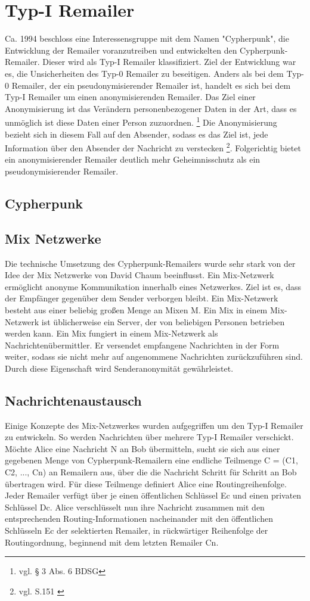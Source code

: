 \chapter{Typ-I Remailer}
Ca. 1994 beschloss eine Interessensgruppe mit dem Namen "Cypherpunk", die Entwicklung der Remailer voranzutreiben und entwickelten den Cypherpunk-Remailer. Dieser wird als Typ-I Remailer klassifiziert. Ziel der Entwicklung war es, die Unsicherheiten des Typ-0 Remailer zu beseitigen. 
Anders als bei dem Typ-0 Remailer, der ein pseudonymisierender Remailer ist, handelt es sich bei dem Typ-I Remailer um einen anonymisierenden Remailer. Das Ziel einer Anonymisierung ist das Verändern personenbezogener Daten in der Art, dass es unmöglich ist diese Daten einer Person zuzuordnen. \footnote {vgl. § 3 Abs. 6 BDSG}
Die Anonymisierung bezieht sich in diesem Fall auf den Absender, sodass es das Ziel ist, jede Information über den Absender der Nachricht zu verstecken \footnote{vgl. S.151 \cite{horster2013datenschutz}}. Folgerichtig bietet ein anonymisierender Remailer deutlich mehr Geheimnisschutz als ein pseudonymisierender Remailer. 


\section{Cypherpunk}

\section{Mix Netzwerke}
Die technische Umsetzung des Cypherpunk-Remailers wurde sehr stark von der Idee der Mix Netzwerke von David Chaum beeinflusst. Ein Mix-Netzwerk ermöglicht anonyme Kommunikation innerhalb eines Netzwerkes. Ziel ist es, dass der Empfänger gegenüber dem Sender verborgen bleibt.
Ein Mix-Netzwerk besteht aus einer beliebig großen Menge an Mixen M. Ein Mix in einem Mix-Netzwerk ist üblicherweise ein Server, der von beliebigen Personen betrieben werden kann. Ein Mix fungiert in einem Mix-Netzwerk als Nachrichtenübermittler. Er versendet empfangene Nachrichten in der Form weiter, sodass sie nicht mehr auf angenommene Nachrichten zurückzuführen sind. Durch diese Eigenschaft wird Senderanonymität gewährleistet.

\section{Nachrichtenaustausch}
Einige Konzepte des Mix-Netzwerkes wurden aufgegriffen um den Typ-I Remailer zu entwickeln. So werden Nachrichten über mehrere Typ-I Remailer verschickt. Möchte Alice eine Nachricht N an Bob übermitteln, sucht sie sich aus einer gegebenen Menge von Cypherpunk-Remailern eine endliche Teilmenge C = (C1, C2, ..., Cn) an Remailern aus, über die die Nachricht Schritt für Schritt an Bob übertragen wird. Für diese Teilmenge definiert Alice eine Routingreihenfolge. Jeder Remailer verfügt über je einen öffentlichen Schlüssel Ec und einen privaten Schlüssel Dc.
Alice verschlüsselt nun ihre Nachricht zusammen mit den entsprechenden Routing-Informationen nacheinander mit den öffentlichen Schlüsseln Ec der selektierten Remailer, in rückwärtiger Reihenfolge der Routingordnung, beginnend mit dem letzten Remailer Cn.

